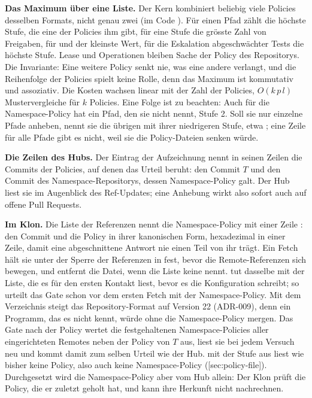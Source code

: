 {\bf Das Maximum über eine Liste.}
Der Kern kombiniert beliebig viele Policies desselben Formats, nicht genau zwei
(im Code ).
Für einen Pfad zählt die höchste Stufe, die eine der Policies ihm gibt, für eine Stufe die
grösste Zahl von Freigaben, für  und  der kleinste
Wert, für die Eskalation abgeschwächter Tests die höchste Stufe.
Lease und Operationen bleiben Sache der Policy des Repositorys.
Die Invariante: Eine weitere Policy senkt nie, was eine andere verlangt, und die Reihenfolge der
Policies spielt keine Rolle, denn das Maximum ist kommutativ und assoziativ.
Die Kosten wachsen linear mit der Zahl der Policies, $O(k\,p\,l)$ Mustervergleiche für $k$
Policies.
Eine Folge ist zu beachten: Auch für die Namespace-Policy hat ein Pfad, den sie nicht nennt,
Stufe 2.
Soll sie nur einzelne Pfade anheben, nennt sie die übrigen mit ihrer niedrigeren Stufe, etwa
; eine Zeile für alle Pfade gibt es nicht, weil sie die Policy-Dateien senken
würde.

{\bf Die Zeilen des Hubs.}
Der Eintrag der Aufzeichnung nennt in seinen Zeilen  die Commits der Policies, auf
denen das Urteil beruht: den Commit $T$ und den Commit des Namespace-Repositorys, dessen
Namespace-Policy galt.
Der Hub liest sie im Augenblick des Ref-Updates; eine Anhebung wirkt also sofort auch auf offene
Pull Requests.

{\bf Im Klon.}
Die Liste der Referenzen nennt die Namespace-Policy mit einer Zeile :
den Commit und die Policy in ihrer kanonischen Form, hexadezimal in einer Zeile, damit eine
abgeschnittene Antwort nie einen Teil von ihr trägt.
Ein Fetch hält sie unter der Sperre der Referenzen in  fest, bevor die
Remote-Referenzen sich bewegen, und entfernt die Datei, wenn die Liste keine nennt.
 tut dasselbe mit der Liste, die es für den ersten Kontakt liest, bevor es die
Konfiguration schreibt; so urteilt das Gate schon vor dem ersten Fetch mit der Namespace-Policy.
Mit dem Verzeichnis  steigt das Repository-Format auf Version 22 (ADR-009),
denn ein Programm, das es nicht kennt, würde ohne die Namespace-Policy mergen.
Das Gate nach der Policy wertet die festgehaltenen Namespace-Policies aller eingerichteten
Remotes neben der Policy von $T$ aus, liest sie bei jedem Versuch neu und kommt damit zum selben
Urteil wie der Hub.
 mit der Stufe aus  liest wie bisher keine Policy, also auch keine
Namespace-Policy ([sec:policy-file]).
Durchgesetzt wird die Namespace-Policy aber vom Hub allein: Der Klon prüft die Policy, die er
zuletzt geholt hat, und kann ihre Herkunft nicht nachrechnen.

